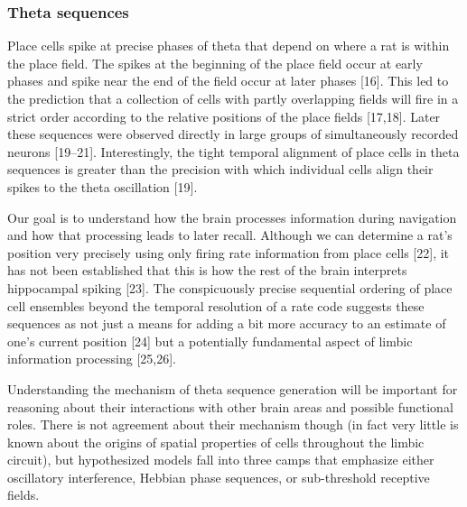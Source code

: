 \documentclass[]{article}
\begin{document}
\subsubsection{Theta sequences}

Place cells spike at precise phases of theta that depend on where a rat
is within the place field. The spikes at the beginning of the place
field occur at early phases and spike near the end of the field occur at
later phases {[}16{]}. This led to the prediction that a collection of
cells with partly overlapping fields will fire in a strict order
according to the relative positions of the place fields {[}17,18{]}.
Later these sequences were observed directly in large groups of
simultaneously recorded neurons {[}19--21{]}. Interestingly, the tight
temporal alignment of place cells in theta sequences is greater than the
precision with which individual cells align their spikes to the theta
oscillation {[}19{]}.

Our goal is to understand how the brain processes information during
navigation and how that processing leads to later recall. Although we
can determine a rat's position very precisely using only firing rate
information from place cells {[}22{]}, it has not been established that
this is how the rest of the brain interprets hippocampal spiking
{[}23{]}. The conspicuously precise sequential ordering of place cell
ensembles beyond the temporal resolution of a rate code suggests these
sequences as not just a means for adding a bit more accuracy to an
estimate of one's current position {[}24{]} but a potentially
fundamental aspect of limbic information processing {[}25,26{]}.

Understanding the mechanism of theta sequence generation will be
important for reasoning about their interactions with other brain areas
and possible functional roles. There is not agreement about their
mechanism though (in fact very little is known about the origins of
spatial properties of cells throughout the limbic circuit), but
hypothesized models fall into three camps that emphasize either
oscillatory interference, Hebbian phase sequences, or sub-threshold
receptive fields.
\end{document}

